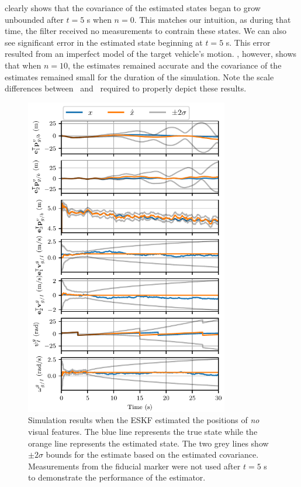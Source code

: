  clearly shows that the covariance
of the estimated
states began to grow unbounded after $t = 5$ s when $n = 0$.
This matches our intuition, as during that time, the filter received no measurements to contrain
these states.
We can also see significant error in the estimated state beginning at $t = 5$ s.
This error resulted from an imperfect model of the target vehicle's motion.
, however, shows that when $n = 10$,
the estimates remained accurate and the covariance of the estimates remained
small for the duration of the simulation.
Note the scale differences between~ and~
required to properly depict these results.

\begin{figure}[htb]
  \centering
  \includegraphics[width=3.5in]{plots/single_run_no_lms}
  \caption[ESKF Simulation Results Using No Visual Features]{Simulation results when the ESKF estimated the positions of \emph{no} visual
  features. The blue line represents the true state while the orange line
  represents the estimated state. The two grey lines show $\pm 2 \sigma$ bounds for
  the estimate based on the estimated covariance. Measurements from the fiducial
  marker were not used after $t = 5$ s
  to demonstrate the performance of the estimator.}
  \label{fig:no_lms}
\end{figure}

